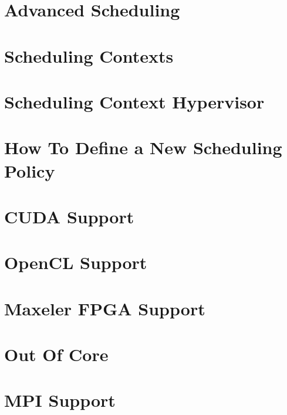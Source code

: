 \chapter{Advanced Scheduling}
\label{AdvancedScheduling}
\hypertarget{AdvancedScheduling}{}


\chapter{Scheduling Contexts}
\label{SchedulingContexts}
\hypertarget{SchedulingContexts}{}


\chapter{Scheduling Context Hypervisor}
\label{SchedulingContextHypervisor}
\hypertarget{SchedulingContextHypervisor}{}


\chapter{How To Define a New Scheduling Policy}
\label{HowToDefineANewSchedulingPolicy}
\hypertarget{HowToDefineANewSchedulingPolicy}{}


\chapter{CUDA Support}
\label{CUDASupport}
\hypertarget{CUDASupport}{}


\chapter{OpenCL Support}
\label{OpenCLSupport}
\hypertarget{OpenCLSupport}{}


\chapter{Maxeler FPGA Support}
\label{MaxFPGASupport}
\hypertarget{MaxFPGASupport}{}


\chapter{Out Of Core}
\label{OutOfCore}
\hypertarget{OutOfCore}{}


\chapter{MPI Support}
\label{MPISupport}
\hypertarget{MPISupport}{}


